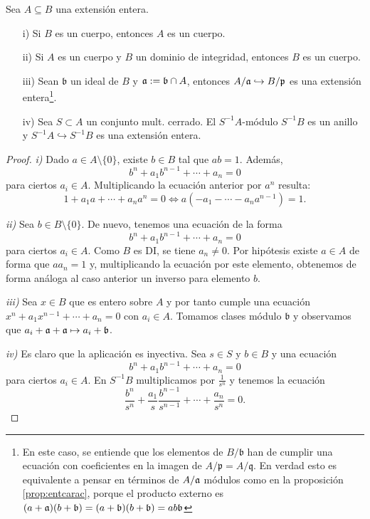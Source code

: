 \documentclass[../main.tex]{subfiles}
\begin{document}
\begin{proposition}Sea $A\subseteq B$ una extensión entera.
\begin{itemize}
    \item[i)] Si $B$ es un cuerpo, entonces $A$ es un cuerpo.
    \item[ii)] Si $A$ es un cuerpo y $B$ un dominio de integridad, entonces $B$ es un cuerpo.
    \item[iii)] Sean $\mathfrak{b}$ un ideal de $B$ y $\mathfrak{a}:=\mathfrak{b}\cap A$, entonces $A/\mathfrak{a}\hookrightarrow B/\mathfrak{p}$ es una extensión entera\footnote{En este caso, se entiende que los elementos de $B/\mathfrak{b}$ han de cumplir una ecuación con coeficientes en la imagen de $A/\mathfrak{p} = A/\mathfrak{q}$. En verdad esto es equivalente a pensar en términos de $A/\mathfrak{a}$ módulos como en la proposición \ref{prop:entcarac}, porque el producto externo es $(a+\mathfrak{a})(b+\mathfrak{b}) =(a+\mathfrak{b})(b+\mathfrak{b}) = ab \mathfrak{b} $}.
    \item[iv)] Sea $S\subset A$ un conjunto mult. cerrado. El $S^{-1}A$-módulo $S^{-1}B$ es un anillo y $S^{-1}A\hookrightarrow S^{-1}B$ es una extensión entera.
\end{itemize}
\end{proposition}
\begin{proof}
\textit{i)} Dado $a\in A\setminus\{0\}$, existe $b\in B $ tal que $ab=1.$ Además,
$$b^n+a_1b^{n-1}+\cdots+a_n=0$$
para ciertos $a_i\in A.$ Multiplicando la ecuación anterior por $a^n$ resulta:
$$1+a_1a+\cdots+a_na^n=0\Longleftrightarrow a(-a_1-\cdots-a_na^{n-1})=1.$$

\textit{ii)} Sea  $b\in B\setminus\{0\}.$ De nuevo, tenemos una ecuación de la forma
$$b^n+a_1b^{n-1}+\cdots+a_n=0$$
para ciertos $a_i\in A.$ Como $B$ es DI, se tiene $a_n\neq0.$ Por hipótesis existe $a\in A$ de forma que $aa_n=1$ y, multiplicando la ecuación por este elemento, obtenemos de forma análoga al caso anterior un inverso para elemento $b.$

\textit{iii)} Sea $x\in B$ que es entero sobre $A$ y por tanto cumple una ecuación $x^n+a_1x^{n-1}+\cdots+a_n=0$ con $a_i \in A$. Tomamos clases módulo $\mathfrak{b}$ y observamos que $a_i+ \mathfrak{a}+ \mathfrak{a} \mapsto a_i +\mathfrak{b}$.

\textit{iv)} Es claro que la aplicación es inyectiva. Sea $s\in S$ y $b\in B$ y una ecuación
$$b^n+a_1b^{n-1}+\cdots+a_n=0$$
para ciertos $a_i\in A.$ En $S^{-1}B$ multiplicamos por $\frac{1}{s^n}$ y tenemos la ecuación
$$\frac{b^n}{s^n}+\frac{a_1}{s}\frac{b^{n-1}}{s^{n-1}}+\cdots+\frac{a_n}{s^n}=0.$$
\end{proof}
\end{document}
